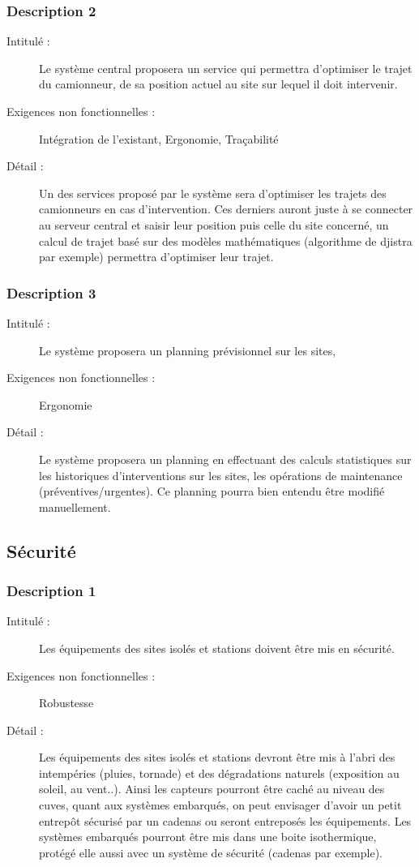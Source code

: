  \subsubsection {Description 2}
\begin{description}
           \item[Intitulé :] Le système central proposera un service qui permettra d'optimiser le trajet du camionneur, de sa position
actuel au site sur lequel il doit intervenir.
           \item[Exigences non fonctionnelles :] Intégration de l'existant, Ergonomie, Traçabilité
           \item[Détail :] Un des services proposé par le système sera d'optimiser les trajets des camionneurs en cas d'intervention.
Ces derniers auront juste à se connecter au serveur central et saisir leur position puis celle du site concerné,
un calcul de trajet basé sur des modèles mathématiques (algorithme de djistra par exemple) permettra d'optimiser 
leur trajet.
\end{description}

 \subsubsection {Description 3}
\begin{description}
           \item[Intitulé :] Le système proposera un planning prévisionnel sur les sites,
           \item[Exigences non fonctionnelles :] Ergonomie
           \item[Détail :] Le système proposera un planning en effectuant des calculs statistiques sur les historiques d'interventions sur les sites, 
les opérations de maintenance (préventives/urgentes). Ce planning pourra bien entendu être modifié manuellement.
\end{description}

\subsection {Sécurité}
 \subsubsection {Description 1}
\begin{description}
           \item[Intitulé :] Les équipements des sites isolés et stations doivent être mis en sécurité.
           \item[Exigences non fonctionnelles :] Robustesse
           \item[Détail :] Les équipements des sites isolés et stations devront être mis à l'abri des intempéries (pluies, tornade) 
et des dégradations naturels (exposition au soleil, au vent..). Ainsi les capteurs pourront être caché au niveau 
des cuves, quant aux systèmes embarqués, on peut envisager d'avoir un petit entrepôt sécurisé par un cadenas ou 
seront entreposés les équipements. Les systèmes embarqués pourront être mis dans une boite isothermique, 
protégé elle aussi avec un système de sécurité (cadenas par exemple).
\end{description}

